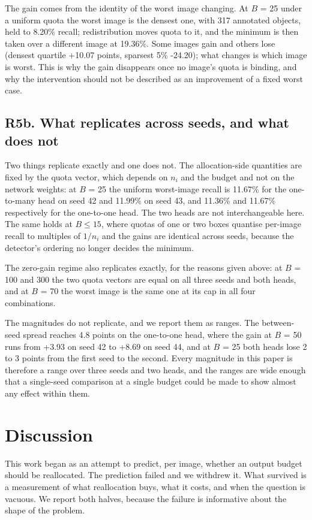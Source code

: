 \documentclass[sn-mathphys,Numbered]{sn-jnl}
\begin{document}
The gain comes from the identity of the worst image changing. At $B$ = 25 under a uniform quota the worst image is the densest one, with 317 annotated objects, held to 8.20\% recall; redistribution moves quota to it, and the minimum is then taken over a different image at 19.36\%. Some images gain and others lose (densest quartile +10.07 points, sparsest 5\% -24.20); what changes is which image is worst. This is why the gain disappears once no image's quota is binding, and why the intervention should not be described as an improvement of a fixed worst case.

\subsection{R5b. What replicates across seeds, and what does not}

Two things replicate exactly and one does not. The allocation-side quantities are fixed by the quota vector, which depends on $n_i$ and the budget and not on the network weights: at $B$ = 25 the uniform worst-image recall is 11.67\% for the one-to-many head on seed 42 and 11.99\% on seed 43, and 11.36\% and 11.67\% respectively for the one-to-one head. The two heads are not interchangeable here. The same holds at $B \leq{} 15$, where quotas of one or two boxes quantise per-image recall to multiples of $1/n_i$ and the gains are identical across seeds, because the detector's ordering no longer decides the minimum.

The zero-gain regime also replicates exactly, for the reasons given above: at $B$ = 100 and 300 the two quota vectors are equal on all three seeds and both heads, and at $B$ = 70 the worst image is the same one at its cap in all four combinations.

The magnitudes do not replicate, and we report them as ranges. The between-seed spread reaches 4.8 points on the one-to-one head, where the gain at $B$ = 50 runs from +3.93 on seed 42 to +8.69 on seed 44, and at $B$ = 25 both heads lose 2 to 3 points from the first seed to the second. Every magnitude in this paper is therefore a range over three seeds and two heads, and the ranges are wide enough that a single-seed comparison at a single budget could be made to show almost any effect within them.

\section{Discussion}
This work began as an attempt to predict, per image, whether an output budget should be reallocated. The prediction failed and we withdrew it. What survived is a measurement of what reallocation buys, what it costs, and when the question is vacuous. We report both halves, because the failure is informative about the shape of the problem.
\end{document}
